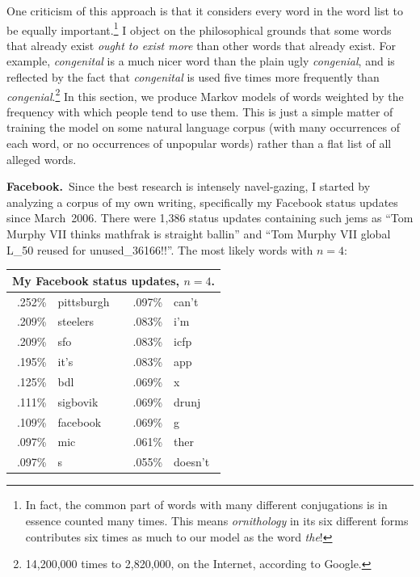 \documentclass[twocolumn]{article}
\begin{document}
One criticism of this approach is that it considers every word in the
word list to be equally important.\!\footnote{In fact, the common part
  of words with many different conjugations is in essence counted many
  times. This means {\it ornithology} in its six different forms
  contributes six times as much to our model as the word {\it the}!} I
object on the philosophical grounds that some words that already exist
{\em ought to exist more} than other words that already exist. For
example, {\it congenital} is a much nicer word than the plain ugly
{\it congenial}, and is reflected by the fact that {\it congenital} is
used five times more frequently than {\it
  congenial}.\!\footnote{14,200,000 times to 2,820,000, on the
  Internet, according to Google.} In this section, we produce Markov
models of words weighted by the frequency with which people tend to
use them. This is just a simple matter of training the model on some
natural language corpus (with many occurrences of each word, or no
occurrences of unpopular words) rather than a flat list of all alleged
words.

{\bf Facebook.}\ Since the best research is intensely navel-gazing, I started by 
analyzing a corpus of my own writing, specifically my Facebook status
updates since March~2006. There were 1,386 status updates containing
such jems as ``Tom Murphy VII thinks mathfrak is straight ballin''
and ``Tom Murphy VII global L\_50 reused for unused\_36166!!''. The
most likely words with $n=4$:

\begin{center}
\begin{tabular}{rl@{\quad\quad}rl}
\multicolumn{4}{c}{My Facebook status updates, $n=4$.} \\
\hline
.252\% &  pittsburgh   & .097\% &  can't    \\   
.209\% &  steelers     & .083\% &  i'm      \\   
.209\% &  sfo          & .083\% &  icfp     \\   
.195\% &  it's         & .083\% &  app      \\   
.125\% &  bdl          & .069\% &  x        \\   
.111\% &  sigbovik     & .069\% &  drunj    \\   
.109\% &  facebook     & .069\% &  g        \\   
.097\% &  mic          & .061\% &  ther     \\   
.097\% &  s            & .055\% &  doesn't  \\
\end{tabular}
\end{center}
\end{document}
